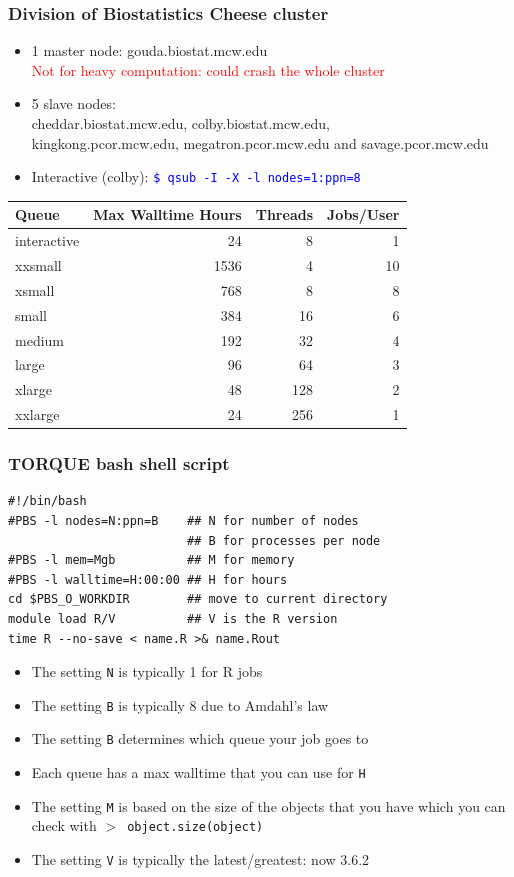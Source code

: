 \documentclass[11pt,pdftex,dvipsnames,usenames,helvetica]{beamer}
\begin{document}
\begin{frame}[fragile] 
\frametitle{Division of Biostatistics Cheese cluster}
\begin{itemize}
\item 1 master node: gouda.biostat.mcw.edu\\
\textcolor{red}{Not for heavy computation: could crash the whole cluster}
\item 5 slave nodes:\\ cheddar.biostat.mcw.edu, colby.biostat.mcw.edu,\\ 
kingkong.pcor.mcw.edu, megatron.pcor.mcw.edu
and savage.pcor.mcw.edu
\item Interactive (colby): \textcolor{blue}{\tt \$ qsub -I -X -l
    nodes=1:ppn=8}
\end{itemize}
\begin{center}
\begin{tabular}{lrrr} \hline
Queue & Max Walltime Hours & Threads & Jobs/User \\ \hline
interactive & 24 & 8 & 1 \\
xxsmall & 1536 &  4 & 10 \\
xsmall  &  768 &  8 &  8 \\
small   &  384 & 16 &  6 \\
medium  &  192 & 32 &  4 \\
large   &   96 & 64 &  3 \\
xlarge  &   48 &128 &  2 \\
xxlarge &   24 &256 &  1 \\
\end{tabular}
\end{center}
\end{frame}

\begin{frame}[fragile] 
\frametitle{TORQUE bash shell script}
\begin{verbatim}
#!/bin/bash 
#PBS -l nodes=N:ppn=B    ## N for number of nodes 
                         ## B for processes per node
#PBS -l mem=Mgb          ## M for memory
#PBS -l walltime=H:00:00 ## H for hours
cd $PBS_O_WORKDIR        ## move to current directory
module load R/V          ## V is the R version
time R --no-save < name.R >& name.Rout
\end{verbatim}
\begin{itemize}
\item The setting {\tt N} is typically 1 for R jobs
\item The setting {\tt B} is typically 8 due to Amdahl's law
\item The setting {\tt B} determines which queue your job goes to\\
\item Each queue has a max walltime that you can use for {\tt H}
\item The setting {\tt M} is based on the size of the objects
that you have which you can check with {\tt $>$ object.size(object)}
\item The setting {\tt V} is typically the latest/greatest: now 3.6.2
\end{itemize}
\end{frame}
\end{document}
